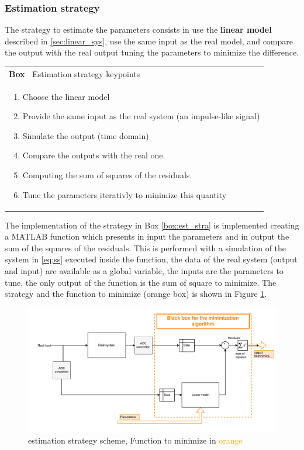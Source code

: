 \documentclass[twosided,a4paper]{article}           %
\newcounter{box}
\newenvironment{scatola}[1]
{\refstepcounter{box}
\begin{center}
		\begin{tabular}{|p{\linewidth}|}
			\hline \textbf{Box~\thebox} #1  \\
		}
		{ 
			 \\ \hline
		\end{tabular} 
	\end{center}
 }
\begin{document}
\subsubsection{Estimation strategy}
	\label{sec:est_strat}
 The strategy to estimate the parameters consists in use the \textbf{linear model} described in \ref{sec:linear_sys}, use the same input as the real model, and compare the output with the real output tuning the parameters to minimize the difference.
\begin{scatola}{Estimation strategy keypoints}
	\label{box:est_stra}
 \begin{enumerate}
	 \item Choose the linear model
	 \item Provide the same input as the real system (an impulse-like signal)
	 \item Simulate the output (time domain)
	 \item Compare the outputs with the real one.
	 \item Computing the sum of squares of the residuals
	 \item Tune the parameters iterativly to minimize this quantity
 \end{enumerate}
\end{scatola}
The implementation of the strategy in Box \ref{box:est_stra} is implemented creating a MATLAB function which presents in input the parameters and in output the sum of the squares of the residuals. This is performed with a simulation of the system in \eqref{eq:ss} executed inside the function, the data of the real system (output and input) are available as a global variable, the inputs are the parameters to tune, the only output of the function is the sum of square to minimize. The strategy and the function to minimize (orange box) is shown in Figure \ref{fig:eststrategy}.
\begin{figure}[H]
	\centering
	\includegraphics[width=\linewidth]{img/est_strategy}
	\caption{estimation strategy scheme, Function to minimize in \textcolor{orange}{orange}}
	\label{fig:eststrategy}
\end{figure}
\end{document}
